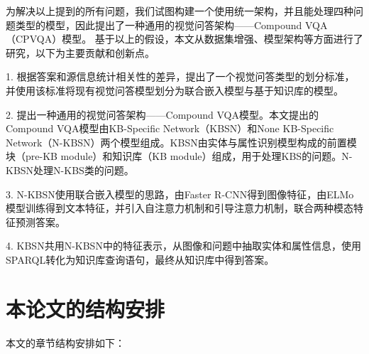 为解决以上提到的所有问题，我们试图构建一个使用统一架构，并且能处理四种问题类型的模型，因此提出了一种通用的视觉问答架构——Compound VQA（CPVQA）模型。
基于以上的假设，本文从数据集增强、模型架构等方面进行了研究，以下为主要贡献和创新点。

1. 根据答案和源信息统计相关性的差异，提出了一个视觉问答类型的划分标准，并使用该标准将现有视觉问答模型划分为联合嵌入模型与基于知识库的模型。

2. 提出一种通用的视觉问答架构——Compound VQA模型。本文提出的Compound VQA模型由KB-Specific Network（KBSN）和None KB-Specific Network（N-KBSN）两个模型组成。KBSN由实体与属性识别模型构成的前置模块（pre-KB module）和知识库（KB module）组成，用于处理KBS的问题。N-KBSN处理N-KBS类的问题。

3. N-KBSN使用联合嵌入模型的思路，由Faster R-CNN得到图像特征，由ELMo模型训练得到文本特征，并引入自注意力机制和引导注意力机制，联合两种模态特征预测答案。

4. KBSN共用N-KBSN中的特征表示，从图像和问题中抽取实体和属性信息，使用SPARQL转化为知识库查询语句，最终从知识库中得到答案。

\section{本论文的结构安排}
本文的章节结构安排如下：
